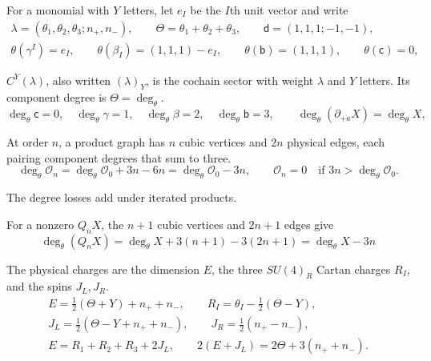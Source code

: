 \documentclass[11pt]{article}
\numberwithin{equation}{section}
\numberwithin{figure}{section}
\numberwithin{table}{section}
\begin{document}
For a monomial with $Y$ letters, let $e_I$ be the $I$th unit vector and write
\begin{equation}\label{eq-E-sector}
\begin{gathered}\lambda=(\theta_1,\theta_2,\theta_3;n_+,n_-),\qquad \Theta=\theta_1+\theta_2+\theta_3,\qquad \mathsf d=(1,1,1;-1,-1),\\ \theta(\gamma^I)=e_I,\qquad \theta(\beta_I)=(1,1,1)-e_I,\qquad \theta(\mathsf b)=(1,1,1),\qquad \theta(\mathsf c)=0,\end{gathered}
\end{equation}

$C^Y(\lambda)$, also written $(\lambda)_Y$, is the cochain sector with weight $\lambda$ and $Y$ letters. Its component degree is $\Theta=\deg_\theta$.
\begin{equation}\label{eq-2-62}
\deg_\theta\mathsf c=0,\quad\deg_\theta\gamma=1,\quad\deg_\theta\beta=2,\quad\deg_\theta\mathsf b=3,\qquad\deg_\theta(\partial_{+\dot a}X)=\deg_\theta X,
\end{equation}

At order $n$, a product graph has $n$ cubic vertices and $2n$ physical edges, each pairing component degrees that sum to three.
\begin{equation}\label{eq-2-63}
\deg_\theta\mathcal O_n=\deg_\theta\mathcal O_0+{3n}-{6n}=\deg_\theta\mathcal O_0-3n,\qquad\mathcal O_n=0\quad\text{if }3n>\deg_\theta\mathcal O_0.
\end{equation}

The degree losses add under iterated products.

For a nonzero $Q_nX$, the $n+1$ cubic vertices and $2n+1$ edges give
\begin{equation}\label{eq-graviton-differential-degree}
\deg_\theta(Q_nX)
=\deg_\theta X+3(n+1)-3(2n+1)=\deg_\theta X-3n
\end{equation}

The physical charges are the dimension $E$, the three $SU(4)_R$ Cartan charges $R_I$, and the spins $J_L,J_R$.
\begin{equation}\label{eq-E-charges}
\begin{gathered}E=\tfrac12(\Theta+Y)+n_++n_-,\qquad R_I=\theta_I-\tfrac12(\Theta-Y),\\ J_L=\tfrac12(\Theta-Y+n_++n_-),\qquad J_R=\tfrac12(n_+-n_-),\\ E=R_1+R_2+R_3+2J_L,\qquad 2(E+J_L)=2\Theta+3(n_++n_-).\end{gathered}
\end{equation}
\end{document}
